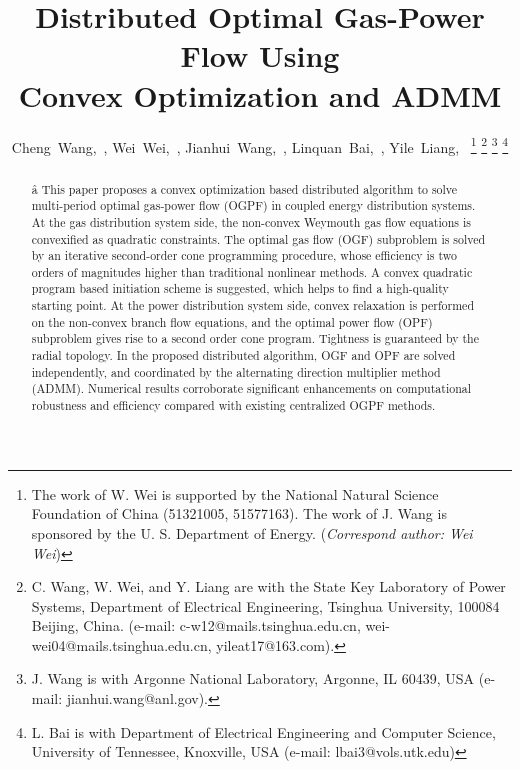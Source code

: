 \documentclass[journal]{IEEEtran}
\begin{document}
\title{Distributed Optimal Gas-Power Flow Using \\ Convex Optimization and ADMM}
\author{Cheng~Wang,~, Wei~Wei,~, Jianhui~Wang,~, Linquan~Bai,~, Yile~Liang,~
\thanks{The work of W. Wei is supported by the National Natural Science Foundation of China (51321005, 51577163). The work of J. Wang is sponsored by the U. S. Department of Energy. (\emph{Correspond author: Wei Wei})} 
\thanks{C. Wang, W. Wei, and Y. Liang are with the State Key Laboratory of Power Systems, Department of Electrical Engineering, Tsinghua University, 100084 Beijing, China. (e-mail: c-w12@mails.tsinghua.edu.cn, wei-wei04@mails.tsinghua.edu.cn, yileat17@163.com).}
\thanks{J. Wang is with Argonne National Laboratory, Argonne, IL 60439, USA (e-mail: jianhui.wang@anl.gov).}
\thanks{L. Bai is with Department of Electrical Engineering and Computer Science, University of Tennessee, Knoxville, USA (e-mail: lbai3@vols.utk.edu)}}
\maketitle

\begin{abstract}
â This paper proposes a convex optimization based distributed algorithm to solve multi-period optimal gas-power flow (OGPF) in coupled energy distribution systems. At the gas distribution system side, the non-convex Weymouth gas flow equations is convexified as quadratic constraints. The optimal gas flow (OGF) subproblem is solved by an iterative second-order cone programming procedure, whose efficiency is two orders of magnitudes higher than traditional nonlinear methods. A convex quadratic program based initiation scheme is suggested, which helps to find a high-quality starting point. At the power distribution system side, convex relaxation is performed on the non-convex branch flow equations, and the optimal power flow (OPF) subproblem gives rise to a second order cone program. Tightness is guaranteed by the radial topology. In the proposed distributed algorithm, OGF and OPF are solved independently, and coordinated by the alternating direction multiplier method (ADMM). Numerical results corroborate significant enhancements on computational robustness and  efficiency compared with existing centralized  OGPF methods.
\end{abstract}
\end{document}
